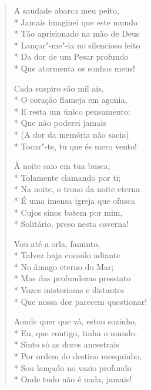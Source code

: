 \begin{verse}
A saudade abarca meu peito,\\*
Jamais imaginei que este mundo\\*
Tão aprisionado na mão de Deus\\*
Lançar"-me"-ia no silencioso leito\\*
Da dor de um Pesar profundo\\*
Que atormenta os sonhos meus!

Cada suspiro são mil ais,\\*
O coração flameja em agonia,\\*
E resta um único pensamento:\\*
Que não poderei jamais\\*
(A dor da memória não sacia)\\*
Tocar"-te, tu que és mero vento!

À noite saio em tua busca,\\*
Tolamente clamando por ti;\\*
Na noite, o trono da noite eterna\\*
É uma imensa igreja que ofusca\\*
Cujos sinos batem por mim,\\*
Solitário, preso nesta caverna!

Vou até a orla, faminto,\\*
Talvez haja consolo adiante\\*
No âmago eterno do Mar;\\*
Mas das profundezas pressinto\\*
Vozes misteriosas e distantes\\*
Que nossa dor parecem questionar!

Aonde quer que vá, estou sozinho,\\*
Eu, que contigo, tinha o mundo.\\*
Sinto só as dores ancestrais\\*
Por ordem do destino mesquinho,\\*
Sou lançado no vazio profundo\\*
Onde tudo não é nada, jamais!
\end{verse}